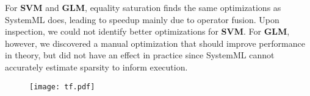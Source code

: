
For \textbf{SVM} and \textbf{GLM}, equality saturation finds the same optimizations as
SystemML does, leading to speedup mainly due to operator fusion. Upon
inspection, we could not identify better optimizations for \textbf{SVM}. For
\textbf{GLM}, however, we discovered a manual optimization that should improve
performance in theory, but did not have an effect in practice since SystemML
cannot accurately estimate sparsity to inform execution. 

\begin{figure}
    \centering  \texttt{[image: tf.pdf]}
    \caption{}
    \label{tfeval}
    \vspace{-10pt}
\end{figure}

